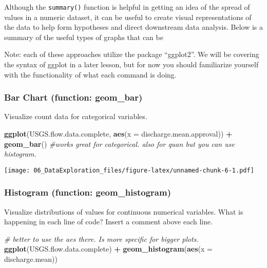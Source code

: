 \documentclass[]{article}
\newenvironment{Shaded}{\begin{snugshade}}{\end{snugshade}}
\newcommand{\KeywordTok}[1]{\textcolor[rgb]{0.13,0.29,0.53}{\textbf{#1}}}
\newcommand{\DataTypeTok}[1]{\textcolor[rgb]{0.13,0.29,0.53}{#1}}
\newcommand{\StringTok}[1]{\textcolor[rgb]{0.31,0.60,0.02}{#1}}
\newcommand{\CommentTok}[1]{\textcolor[rgb]{0.56,0.35,0.01}{\textit{#1}}}
\newcommand{\OperatorTok}[1]{\textcolor[rgb]{0.81,0.36,0.00}{\textbf{#1}}}
\newcommand{\NormalTok}[1]{#1}
\begin{document}
Although the \texttt{summary()} function is helpful in getting an idea
of the spread of values in a numeric dataset, it can be useful to create
visual representations of the data to help form hypotheses and direct
downstream data analysis. Below is a summary of the useful types of
graphs that can be

Note: each of these approaches utilize the package ``ggplot2''. We will
be covering the syntax of ggplot in a later lesson, but for now you
should familiarize yourself with the functionality of what each command
is doing.

\subsubsection{Bar Chart (function:
geom\_bar)}\label{bar-chart-function-geom_bar}

Visualize count data for categorical variables.

\begin{Shaded}
\begin{Highlighting}[]
\KeywordTok{ggplot}\NormalTok{(USGS.flow.data.complete, }\KeywordTok{aes}\NormalTok{(}\DataTypeTok{x =}\NormalTok{ discharge.mean.approval)) }\OperatorTok{+}
\StringTok{  }\KeywordTok{geom_bar}\NormalTok{() }\CommentTok{#works great for categorical. also for quan but you can use histogram.}
\end{Highlighting}
\end{Shaded}

\texttt{[image: 06\_DataExploration\_files/figure-latex/unnamed-chunk-6-1.pdf]}

\subsubsection{Histogram (function:
geom\_histogram)}\label{histogram-function-geom_histogram}

Visualize distributions of values for continuous numerical variables.
What is happening in each line of code? Insert a comment above each
line.

\begin{Shaded}
\begin{Highlighting}[]
\CommentTok{# better to use the aes there. Is more specific for bigger plots.}
\KeywordTok{ggplot}\NormalTok{(USGS.flow.data.complete) }\OperatorTok{+}
\StringTok{  }\KeywordTok{geom_histogram}\NormalTok{(}\KeywordTok{aes}\NormalTok{(}\DataTypeTok{x =}\NormalTok{ discharge.mean))}
\end{Highlighting}
\end{Shaded}
\end{document}
